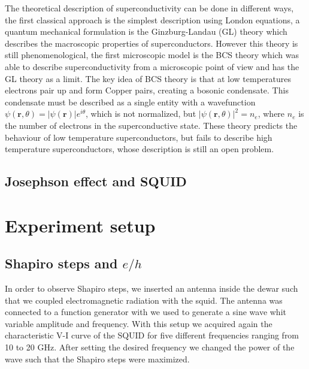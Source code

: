 \documentclass[a4paper,10pt]{article}
\begin{document}
The theoretical description of superconductivity can be done in different ways, the first classical approach is the simplest description using London equations, a quantum mechanical formulation is the Ginzburg-Landau (GL) theory which describes the macroscopic properties of superconductors. However this theory is still phenomenological, the first microscopic model is the BCS theory which was able to describe superconductivity from a microscopic point of view and has the GL theory as a limit. The key idea of BCS theory is that at low temperatures electrons pair up and form Copper pairs, creating a bosonic condensate. This condensate must be described as a single entity with a wavefunction $\psi(\mathbf{r},\theta) = |\psi(\mathbf{r})| e^{i\theta}$, which is not normalized, but $|\psi(\mathbf{r},\theta)|^2 = n_e$, where $n_e$ is the number of electrons in the superconductive state. These theory predicts the behaviour of low temperature superconductors, but fails to describe high temperature superconductors, whose description is still an open problem.


\subsection{Josephson effect and SQUID}

\section{Experiment setup}
\subsection{Shapiro steps and $e/h$}
In order to observe Shapiro steps, we inserted an antenna inside the dewar such that we coupled electromagnetic radiation with the squid. The antenna was connected to a function generator with we used to generate a sine wave whit variable amplitude and frequency. With this setup we acquired again the characteristic V-I curve of the SQUID for five different frequencies ranging from 10 to 20 GHz. After setting the desired frequency we changed the power of the wave such that the Shapiro steps were maximized.
\end{document}
